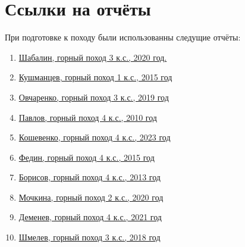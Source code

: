 \section{Ссылки на отчёты}\label{sec:referenses}
    При подготовке к походу были использованны следущие отчёты:
    \begin{enumerate}
        \item \href{https://www.geolink-group.com/tourclub/trips/2020ms3/}{Шабалин, горный поход 3 к.с., 2020 год.}
        \item \href{https://stksplav.narod.ru/reports/2015/Kushmantchev_Digoriya-2015.pdf}{Кушманцев, горный поход 1 к.с., 2015 год}
        \item \href{https://www.tlib.ru/doc.aspx?id=41849&page=1}{Овчаренко, горный поход 3 к.с., 2019 год}
        \item \href{https://www.tlib.ru/doc.aspx?id=42012&page=1}{Павлов, горный поход 4 к.с., 2010 год}
        \item \href{https://disk.yandex.ru/i/q_hmH7NqC-Du_A}{Кошевенко, горный поход 4 к.с., 2023 год}
        \item \href{www.mountain.ru/article/mainarticle.php?article_id=8277}{Федин, горный поход 4 к.с., 2015 год}
        \item \href{https://stksplav.narod.ru/reports/2013/Otchet_Elbrus-2013-4.pdf}{Борисов, горный поход 4 к.с., 2013 год}
        \item \href{https://www.tlib.ru/doc.aspx?id=42168&page=1}{Мочкина, горный поход 2 к.с., 2020 год}
        \item \href{meridian.perm.ru/03_reports/kavkaz2021_4/Kavkaz2021_4.shtml}{Деменев, горный поход 4 к.с., 2021 год}
        \item \href{www.mountain.ru/article/mainarticle.php?article_id=8998}{Шмелев, горный поход 3 к.с., 2018 год}
    \end{enumerate}
    
